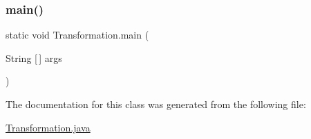 \subsubsection{\texorpdfstring{main()}{main()}}
{\footnotesize\ttfamily static void Transformation.\+main (\begin{DoxyParamCaption}\item[{String \mbox{[}$\,$\mbox{]}}]{args }\end{DoxyParamCaption})\hspace{0.3cm}{\ttfamily [static]}}



The documentation for this class was generated from the following file\+:\begin{DoxyCompactItemize}
\item 
\hyperlink{_transformation_8java}{Transformation.\+java}\end{DoxyCompactItemize}
